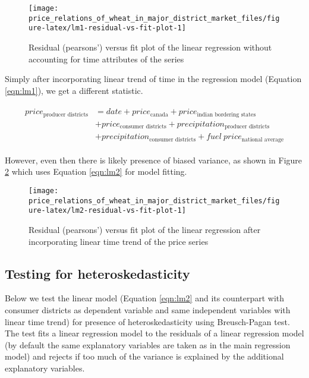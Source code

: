 \documentclass[
  12pt,
]{article}
\begin{document}
\begin{figure}

{\centering \texttt{[image: price\_relations\_of\_wheat\_in\_major\_district\_market\_files/figure-latex/lm1-residual-vs-fit-plot-1]} 

}

\caption{Residual (pearsons') versus fit plot of the linear regression without accounting for time attributes of the series}\label{fig:lm1-residual-vs-fit-plot}
\end{figure}

Simply after incorporating linear trend of time in the regression model (Equation \ref{eqn:lm1}), we get a different statistic.

\begin{equation}
\label{eqn:lm2}
\begin{aligned}
\begin{split}
price_{\textrm{producer districts}} &= date + price_{\textrm{canada}} + price_{\textrm{indian bordering states}} \\ &+
price_{\textrm{consumer districts}} + precipitation_{\textrm{producer districts}} \\ &+
precipitation_{\textrm{consumer districts}} + fuel~price_{\textrm{national average}}
\end{split}
\end{aligned}
\end{equation}

However, even then there is likely presence of biased variance, as shown in Figure \ref{fig:lm2-residual-vs-fit-plot} which uses Equation \ref{eqn:lm2} for model fitting.

\begin{figure}

{\centering \texttt{[image: price\_relations\_of\_wheat\_in\_major\_district\_market\_files/figure-latex/lm2-residual-vs-fit-plot-1]} 

}

\caption{Residual (pearsons') versus fit plot of the linear regression after incorporating linear time trend of the price series}\label{fig:lm2-residual-vs-fit-plot}
\end{figure}

\hypertarget{testing-for-heteroskedasticity}{%
\subsection{Testing for heteroskedasticity}\label{testing-for-heteroskedasticity}}

Below we test the linear model (Equation \ref{eqn:lm2} and its counterpart with consumer districts as dependent variable and same independent variables with linear time trend) for presence of heteroskedasticity using Breusch-Pagan test. The test fits a linear regression model to the residuals of a linear regression model (by default the same explanatory variables are taken as in the main regression model) and rejects if too much of the variance is explained by the additional explanatory variables.
\end{document}
